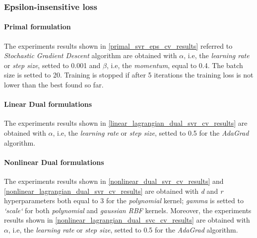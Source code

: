 \subsubsection{Epsilon-insensitive loss}

\paragraph{Primal formulation}

The experiments results shown in \ref{primal_svr_eps_cv_results} referred to \emph{Stochastic Gradient Descent} algorithm are obtained with $\alpha$, i.e, the \emph{learning rate} or \emph{step size}, setted to 0.001 and $\beta$, i.e, the \emph{momentum}, equal to 0.4. The batch size is setted to 20. Training is stopped if after 5 iterations the training loss is not lower than the best found so far.



\paragraph{Linear Dual formulations}

The experiments results shown in \ref{linear_lagrangian_dual_svr_cv_results} are obtained with $\alpha$, i.e, the \emph{learning rate} or \emph{step size}, setted to 0.5 for the \emph{AdaGrad} algorithm.





\paragraph{Nonlinear Dual formulations}

The experiments results shown in \ref{nonlinear_dual_svr_cv_results} and \ref{nonlinear_lagrangian_dual_svr_cv_results} are obtained with \emph{d} and \emph{r} hyperparameters both equal to 3 for the \emph{polynomial} kernel; \emph{gamma} is setted to \emph{`scale`} for both \emph{polynomial} and \emph{gaussian RBF} kernels. Moreover, the experiments results shown in \ref{nonlinear_lagrangian_dual_svc_cv_results} are obtained with $\alpha$, i.e, the \emph{learning rate} or \emph{step size}, setted to 0.5 for the \emph{AdaGrad} algorithm.






